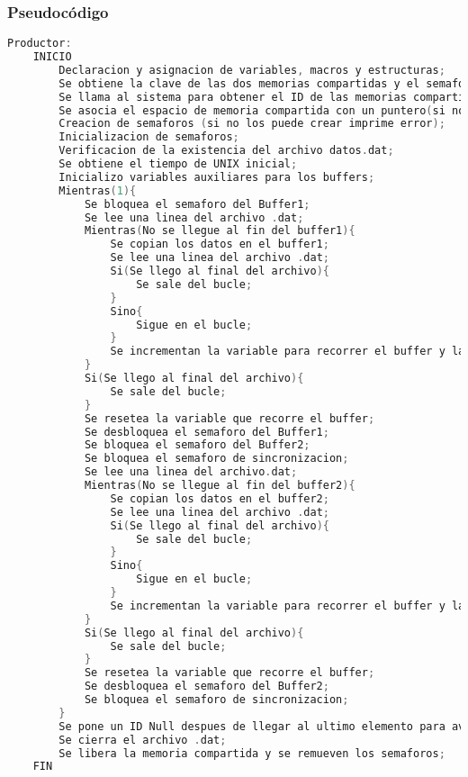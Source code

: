 \subsubsection{Pseudocódigo}

\begin{lstlisting}[language=C]          % No usar tildes en el pseudocódigo
    Productor:
    INICIO
        Declaracion y asignacion de variables, macros y estructuras;
        Se obtiene la clave de las dos memorias compartidas y el semaforo (en el caso de que no las obtenga imprime error);
        Se llama al sistema para obtener el ID de las memorias compartidas (en el caso de que no las obtenga imprime error);
        Se asocia el espacio de memoria compartida con un puntero(si no puede asociar imprime error);
        Creacion de semaforos (si no los puede crear imprime error);
        Inicializacion de semaforos;
        Verificacion de la existencia del archivo datos.dat;
        Se obtiene el tiempo de UNIX inicial;
        Inicializo variables auxiliares para los buffers;
        Mientras(1){
	        Se bloquea el semaforo del Buffer1;
	        Se lee una linea del archivo .dat;
	        Mientras(No se llegue al fin del buffer1){
		        Se copian los datos en el buffer1;
		        Se lee una linea del archivo .dat;
		        Si(Se llego al final del archivo){
			        Se sale del bucle;
                }
                Sino{
    	            Sigue en el bucle;
                }
                Se incrementan la variable para recorrer el buffer y la del id;
	        }
	        Si(Se llego al final del archivo){
	            Se sale del bucle;
            }
            Se resetea la variable que recorre el buffer;
            Se desbloquea el semaforo del Buffer1;
            Se bloquea el semaforo del Buffer2;
            Se bloquea el semaforo de sincronizacion;
            Se lee una linea del archivo.dat;
            Mientras(No se llegue al fin del buffer2){
		        Se copian los datos en el buffer2;
		        Se lee una linea del archivo .dat;
		        Si(Se llego al final del archivo){
			        Se sale del bucle;
                }
                Sino{
                    Sigue en el bucle;
                }
                Se incrementan la variable para recorrer el buffer y la del ID;
            }
            Si(Se llego al final del archivo){
        	    Se sale del bucle;
            }
            Se resetea la variable que recorre el buffer;
            Se desbloquea el semaforo del Buffer2;
            Se bloquea el semaforo de sincronizacion;
        }
        Se pone un ID Null despues de llegar al ultimo elemento para avisarle al consumidor que se llego al EOF;
        Se cierra el archivo .dat;
        Se libera la memoria compartida y se remueven los semaforos;
    FIN


\end{lstlisting}
